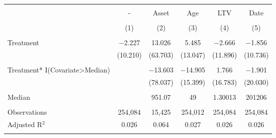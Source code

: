 
\begin{tabular}{@{\extracolsep{5pt}}lccccc} 
\\[-1.8ex]\hline 
\hline \\[-1.8ex] 
 & - & Asset & Age & LTV & Date \\ 
\\[-1.8ex] & (1) & (2) & (3) & (4) & (5)\\ 
\hline \\[-1.8ex] 
 Treatment & $-$2.227 & 13.026 & 5.485 & $-$2.666 & $-$1.856 \\ 
  & (10.210) & (63.703) & (13.047) & (11.896) & (10.736) \\ 
  & & & & & \\ 
 Treatment*
I(Covariate>Median) &  & $-$13.603 & $-$14.905 & 1.766 & $-$1.901 \\ 
  &  & (78.037) & (15.399) & (16.783) & (20.030) \\ 
  & & & & & \\ 
Median &   & 951.07 & 49 & 1.30013 & 201206 \\ 
\hline \\[-1.8ex] 
Observations & 254,084 & 15,425 & 254,012 & 254,084 & 254,084 \\ 
Adjusted R$^{2}$ & 0.026 & 0.064 & 0.027 & 0.026 & 0.026 \\ 
\hline 
\hline \\[-1.8ex] 
\end{tabular} 
